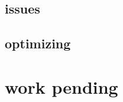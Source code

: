 \documentclass[compress,red]{beamer}
\begin{document}
\subsection{issues}

\subsection{optimizing}

\section{work pending}
\end{document}
